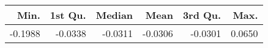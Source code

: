 \begin{table}[ht]
\centering
\begin{tabular}{rrrrrr}
  \hline
Min. & 1st Qu. & Median & Mean & 3rd Qu. & Max. \\ 
  \hline
-0.1988 & -0.0338 & -0.0311 & -0.0306 & -0.0301 & 0.0650 \\ 
   \hline
\end{tabular}
\end{table}
